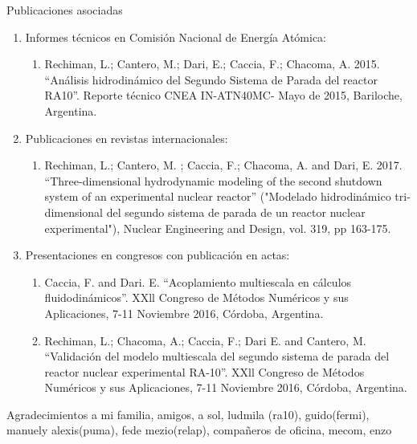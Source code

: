 \documentclass[12pt,screen,twoside,pagebackref]{ibtesis}
\begin{document}
\begin{postliminary}

\begin{seccion}{Publicaciones asociadas}
\begin{enumerate}

\item Informes técnicos en Comisión Nacional de Energía Atómica:
\begin{enumerate}
\item Rechiman, L.; Cantero, M.; Dari, E.; Caccia, F.; Chacoma, A. 2015. “Análisis hidrodinámico del Segundo Sistema de Parada del reactor RA10”. Reporte técnico CNEA IN-ATN40MC- Mayo de 2015, Bariloche, Argentina.
\end{enumerate}

\item Publicaciones en revistas internacionales:
\begin{enumerate}
\item Rechiman, L.; Cantero, M. ; Caccia, F.; Chacoma, A. and Dari, E. 2017. “Three-dimensional hydrodynamic modeling of the second shutdown system of an experimental nuclear reactor” ("Modelado hidrodinámico tri-dimensional del segundo sistema de parada de un reactor nuclear experimental"), Nuclear Engineering and Design, vol. 319, pp 163-175.
\end{enumerate}

\item Presentaciones en congresos con publicación en actas:
\begin{enumerate}
\item Caccia, F. and Dari. E. “Acoplamiento multiescala en cálculos fluidodinámicos”. XXll Congreso de Métodos Numéricos y sus Aplicaciones, 7-11 Noviembre 2016, Córdoba, Argentina.

\item Rechiman, L.; Chacoma, A.; Caccia, F.; Dari E. and Cantero, M. “Validación del modelo multiescala del segundo sistema de parada del reactor nuclear experimental RA-10”. XXll Congreso de Métodos Numéricos y sus Aplicaciones, 7-11 Noviembre 2016, Córdoba, Argentina.
\end{enumerate}

\end{enumerate}
\end{seccion}

\begin{seccion}{Agradecimientos}
a mi familia, 
amigos, 
a sol, 
ludmila (ra10), guido(fermi), manuely alexis(puma), fede mezio(relap),
compañeros de oficina,
mecom,
enzo
\end{seccion}

\end{postliminary}
\end{document}
